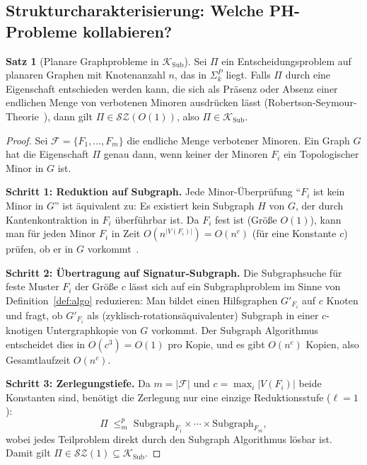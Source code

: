﻿\documentclass[a4paper,12pt]{article}
\theoremstyle{definition}
\newtheorem{satz}{Satz}
\begin{document}
\subsection{Strukturcharakterisierung: Welche PH-Probleme kollabieren?}

\begin{satz}[Planare Graphprobleme in $\mathcal{K}_\mathrm{Sub}$]
\label{satz:planar}
  Sei $\Pi$ ein Entscheidungsproblem auf planaren Graphen mit Knotenanzahl $n$,
  das in $\Sigma_k^P$ liegt.
  Falls $\Pi$ durch eine Eigenschaft entschieden werden kann, die sich als
  Präsenz oder Absenz einer endlichen Menge von verbotenen Minoren ausdrücken
  lässt (Robertson-Seymour-Theorie~\cite{robertson1986graph}),
  dann gilt $\Pi \in \mathcal{SZ}(O(1))$, also $\Pi \in \mathcal{K}_\mathrm{Sub}$.
\end{satz}

\begin{proof}
  Sei $\mathcal{F} = \{F_1, \ldots, F_m\}$ die endliche Menge verbotener Minoren.
  Ein Graph $G$ hat die Eigenschaft $\Pi$ genau dann, wenn keiner der Minoren $F_i$
  ein Topologischer Minor in $G$ ist.

  \textbf{Schritt 1: Reduktion auf Subgraph.}
  Jede Minor-Überprüfung ``$F_i$ ist kein Minor in $G$'' ist äquivalent zu:
  Es existiert kein Subgraph $H$ von $G$, der durch Kantenkontraktion in $F_i$
  überführbar ist. Da $F_i$ fest ist (Größe $O(1)$), kann man für jeden Minor $F_i$
  in Zeit $O(n^{|V(F_i)|}) = O(n^c)$ (für eine Konstante $c$) prüfen, ob er
  in $G$ vorkommt~\cite{robertson1995graph}.

  \textbf{Schritt 2: Übertragung auf Signatur-Subgraph.}
  Die Subgraphsuche für feste Muster $F_i$ der Größe $c$ lässt sich auf
  ein Subgraphproblem im Sinne von Definition~\ref{def:algo} reduzieren:
  Man bildet einen Hilfsgraphen $G'_{F_i}$ auf $c$ Knoten und fragt,
  ob $G'_{F_i}$ als (zyklisch-rotationsäquivalenter) Subgraph in einer
  $c$-knotigen Untergraphkopie von $G$ vorkommt.
  Der Subgraph Algorithmus entscheidet dies in $O(c^3) = O(1)$ pro Kopie,
  und es gibt $O(n^c)$ Kopien, also Gesamtlaufzeit $O(n^c)$.

  \textbf{Schritt 3: Zerlegungstiefe.}
  Da $m = |\mathcal{F}|$ und $c = \max_i |V(F_i)|$ beide Konstanten sind,
  benötigt die Zerlegung nur eine einzige Reduktionsstufe ($\ell = 1$):
  \[
    \Pi \;\leq_m^p\; \mathrm{Subgraph}_{F_1} \times \cdots \times \mathrm{Subgraph}_{F_m},
  \]
  wobei jedes Teilproblem direkt durch den Subgraph Algorithmus lösbar ist.
  Damit gilt $\Pi \in \mathcal{SZ}(1) \subseteq \mathcal{K}_\mathrm{Sub}$.
\end{proof}
\end{document}
